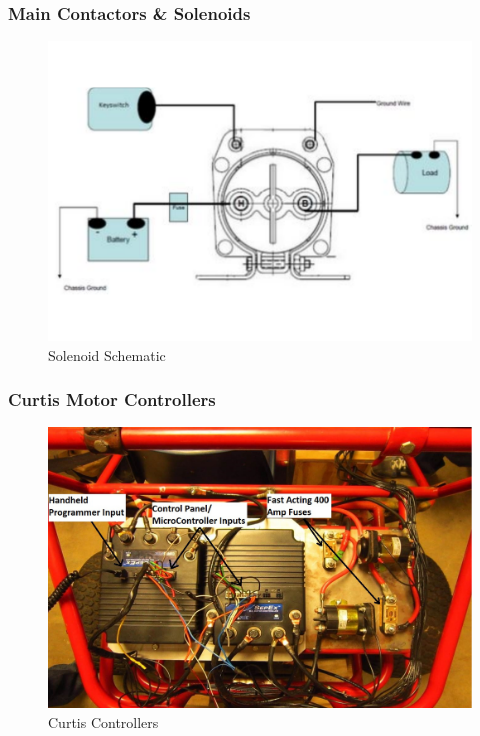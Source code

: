 \documentclass{beamer}
\begin{document}
\begin{frame}
	\frametitle{Main Contactors \& Solenoids}
	\begin{figure}
		\centering 
		\includegraphics[scale=.30]{figures/panel4.pdf}
		\caption{Solenoid Schematic}
	\end{figure}	
\end{frame}
\begin{frame}
	\frametitle{Curtis Motor Controllers}
	\begin{figure}
		\centering 
		\includegraphics[scale=.35]{figures/curtis1.pdf}
		\caption{Curtis Controllers}
	\end{figure}	
\end{frame}
\end{document}
